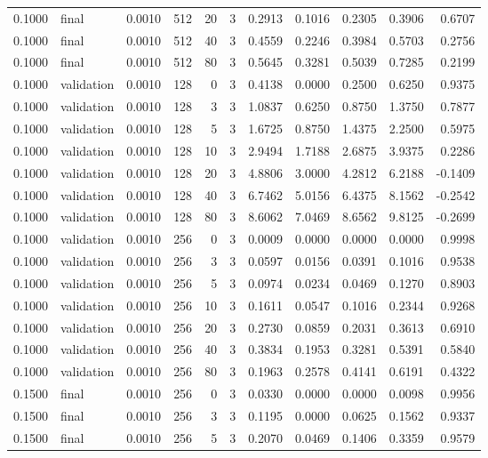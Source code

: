 \begin{tabular}{rlrrrrrrrrr}
0.1000 & final & 0.0010 & 512 & 20 & 3 & 0.2913 & 0.1016 & 0.2305 & 0.3906 & 0.6707 \\
0.1000 & final & 0.0010 & 512 & 40 & 3 & 0.4559 & 0.2246 & 0.3984 & 0.5703 & 0.2756 \\
0.1000 & final & 0.0010 & 512 & 80 & 3 & 0.5645 & 0.3281 & 0.5039 & 0.7285 & 0.2199 \\
0.1000 & validation & 0.0010 & 128 & 0 & 3 & 0.4138 & 0.0000 & 0.2500 & 0.6250 & 0.9375 \\
0.1000 & validation & 0.0010 & 128 & 3 & 3 & 1.0837 & 0.6250 & 0.8750 & 1.3750 & 0.7877 \\
0.1000 & validation & 0.0010 & 128 & 5 & 3 & 1.6725 & 0.8750 & 1.4375 & 2.2500 & 0.5975 \\
0.1000 & validation & 0.0010 & 128 & 10 & 3 & 2.9494 & 1.7188 & 2.6875 & 3.9375 & 0.2286 \\
0.1000 & validation & 0.0010 & 128 & 20 & 3 & 4.8806 & 3.0000 & 4.2812 & 6.2188 & -0.1409 \\
0.1000 & validation & 0.0010 & 128 & 40 & 3 & 6.7462 & 5.0156 & 6.4375 & 8.1562 & -0.2542 \\
0.1000 & validation & 0.0010 & 128 & 80 & 3 & 8.6062 & 7.0469 & 8.6562 & 9.8125 & -0.2699 \\
0.1000 & validation & 0.0010 & 256 & 0 & 3 & 0.0009 & 0.0000 & 0.0000 & 0.0000 & 0.9998 \\
0.1000 & validation & 0.0010 & 256 & 3 & 3 & 0.0597 & 0.0156 & 0.0391 & 0.1016 & 0.9538 \\
0.1000 & validation & 0.0010 & 256 & 5 & 3 & 0.0974 & 0.0234 & 0.0469 & 0.1270 & 0.8903 \\
0.1000 & validation & 0.0010 & 256 & 10 & 3 & 0.1611 & 0.0547 & 0.1016 & 0.2344 & 0.9268 \\
0.1000 & validation & 0.0010 & 256 & 20 & 3 & 0.2730 & 0.0859 & 0.2031 & 0.3613 & 0.6910 \\
0.1000 & validation & 0.0010 & 256 & 40 & 3 & 0.3834 & 0.1953 & 0.3281 & 0.5391 & 0.5840 \\
0.1000 & validation & 0.0010 & 256 & 80 & 3 & 0.1963 & 0.2578 & 0.4141 & 0.6191 & 0.4322 \\
0.1500 & final & 0.0010 & 256 & 0 & 3 & 0.0330 & 0.0000 & 0.0000 & 0.0098 & 0.9956 \\
0.1500 & final & 0.0010 & 256 & 3 & 3 & 0.1195 & 0.0000 & 0.0625 & 0.1562 & 0.9337 \\
0.1500 & final & 0.0010 & 256 & 5 & 3 & 0.2070 & 0.0469 & 0.1406 & 0.3359 & 0.9579 \\

\end{tabular}
